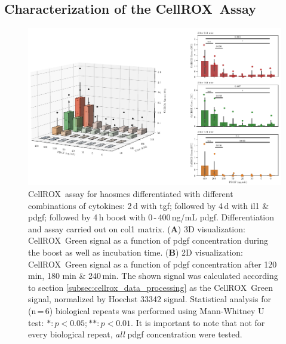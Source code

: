     \subsection{Characterization of the CellROX\texttrademark~Assay}
    \begin{figure}[h!]
    \capstart
        \centering
    	\includegraphics{Abbildung/CellROX_titration_no_norm.pdf}

    	\begin{minipage}{\captionwidth}
    		\caption[cellROX_titration]{ \newline
            CellROX\texttrademark~assay for \acp{haosmc} differentiated with different combinations of cytokines: 2\,d with \ac{tgf}; followed by 4\,d with \ac{il1} \& \ac{pdgf}; followed by 4\,h boost with 0\,-\,400\,ng/mL \ac{pdgf}. Differentiation and assay carried out on \ac{col1} matrix.
            (\textbf{A}) 3D visualization: CellROX\texttrademark~Green signal as a function of \ac{pdgf} concentration during the boost as well as incubation time.
            (\textbf{B}) 2D visualization: CellROX\texttrademark~Green signal as a function of \ac{pdgf} concentration after 120 min, 180 min \& 240\,min.
            The shown signal was calculated according to section \ref{subsec:cellrox_data_processing} as the CellROX\texttrademark~Green signal, normalized by Hoechst 33342 signal. Statistical analysis for (n\,=\,6) biological repeats was performed using Mann-Whitney U test: $*: p < 0.05; **: p < 0.01$. It is important to note that not for every biological repeat, \textit{all} \ac{pdgf} concentration were tested. }
    		\label{fig:cellROX_titration}
    	\end{minipage}
    \end{figure}

